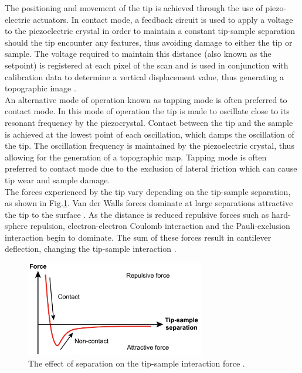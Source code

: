The positioning and movement of the tip is achieved through the use of piezo-electric actuators. In contact mode, a feedback circuit is used to apply a voltage to the piezoelectric crystal in order to maintain a constant tip-sample separation should the tip encounter any features, thus avoiding damage to either the tip or sample. The voltage required to maintain this distance (also known as the setpoint) is registered at each pixel of the scan and is used in conjunction with calibration data to determine a vertical displacement value, thus generating a topographic image \cite{Oliver2008}.\\
An alternative mode of operation known as tapping mode is often preferred to contact mode. In this mode of operation the tip is made to oscillate close to its resonant frequency by the piezocrystal. Contact  between the tip and the sample is achieved at the lowest point of each oscillation, which damps the oscillation of the tip. The oscillation frequency is maintained by the piezoelectric crystal, thus allowing for the generation of a topographic map. Tapping mode is often preferred to contact mode due to the exclusion of lateral friction which can cause tip wear and sample damage.\\
The forces experienced by the tip vary depending on the tip-sample separation, as shown in Fig.\ref{2.2}. Van der Walls forces dominate at large separations attractive the tip to the surface \cite{Oliver2008}. As the distance is reduced repulsive forces such as hard-sphere repulsion, electron-electron Coulomb interaction and the Pauli-exclusion interaction begin to dominate. The sum of these forces result in cantilever deflection, changing the tip-sample interaction \cite{Oliver2008}.

\begin{figure}[h]
	\centering
	\includegraphics[width=0.7\textwidth]{Figs/Ch2/AFMint.png}
	\caption {The effect of separation on the tip-sample interaction force \cite{Zhu2010}.}
	\label{2.2}
\end{figure}
\FloatBarrier

